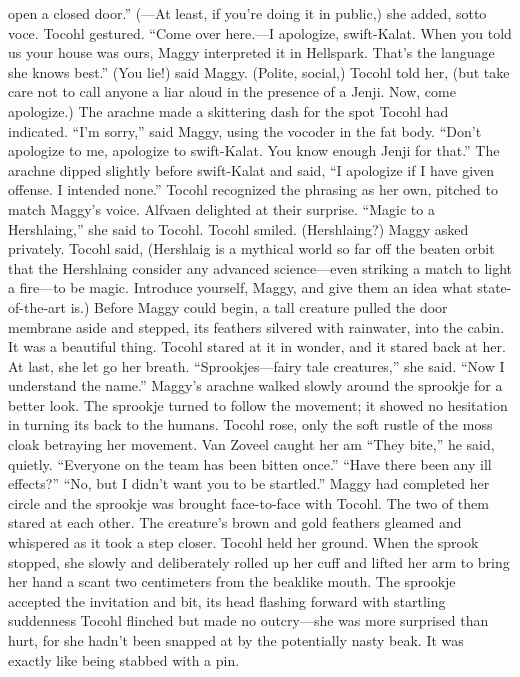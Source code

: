 \documentclass[9pt]{article}
\begin{document}
open a closed door.” (—At least, if you’re doing it in public,) she added, sotto voce.
Tocohl gestured. “Come over here.—I apologize, swift-Kalat. When you told us your house was
ours, Maggy interpreted it in Hellspark. That’s the language she knows best.”
(You lie!) said Maggy.
(Polite, social,) Tocohl told her, (but take care not to call anyone a liar aloud in the presence of a
Jenji. Now, come apologize.)
The arachne made a skittering dash for the spot Tocohl had indicated. “I’m sorry,” said Maggy, using
the vocoder in the fat body.
“Don’t apologize to me, apologize to swift-Kalat. You know enough Jenji for that.”
The arachne dipped slightly before swift-Kalat and said, “I apologize if I have given offense. I
intended none.” Tocohl recognized the phrasing as her own, pitched to match Maggy’s voice.
Alfvaen delighted at their surprise. “Magic to a Hershlaing,” she said to Tocohl. Tocohl smiled.
(Hershlaing?) Maggy asked privately. Tocohl said, (Hershlaig is a mythical world so far off the
beaten orbit that the Hershlaing consider any advanced science—even striking a match to light a fire—to
be magic. Introduce yourself, Maggy, and give them an idea what state-of-the-art is.)
Before Maggy could begin, a tall creature pulled the door membrane aside and stepped, its feathers
silvered with rainwater, into the cabin. It was a beautiful thing. Tocohl stared at it in wonder, and it stared
back at her.
At last, she let go her breath. “Sprookjes—fairy tale creatures,” she said. “Now I understand the
name.”
Maggy’s arachne walked slowly around the sprookje for a better look. The sprookje turned to
follow the movement; it showed no hesitation in turning its back to the humans.
Tocohl rose, only the soft rustle of the moss cloak betraying her movement. Van Zoveel caught her
am “They bite,” he said, quietly. “Everyone on the team has been bitten once.”
“Have there been any ill effects?”
“No, but I didn’t want you to be startled.”
Maggy had completed her circle and the sprookje was brought face-to-face with Tocohl. The two of
them stared at each other. The creature’s brown and gold feathers gleamed and whispered as it took a
step closer.
Tocohl held her ground. When the sprook stopped, she slowly and deliberately rolled up her cuff and
lifted her arm to bring her hand a scant two centimeters from the beaklike mouth.
The sprookje accepted the invitation and bit, its head flashing forward with startling suddenness
Tocohl flinched but made no outcry—she was more surprised than hurt, for she hadn’t been snapped at
by the potentially nasty beak. It was exactly like being stabbed with a pin.
\end{document}
